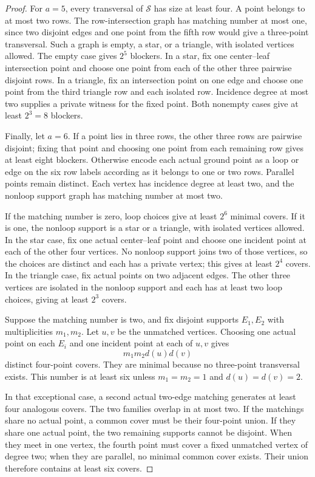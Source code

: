 \documentclass[11pt]{article}
\theoremstyle{definition}
\theoremstyle{remark}
\begin{document}
\begin{proof}
For $a=5$, every transversal of $\mathcal S$ has size at least four.  A point
belongs to at most two rows.  The row-intersection graph has matching number
at most one, since two disjoint edges and one point from the fifth row would
give a three-point transversal.  Such a graph is empty, a star, or a triangle,
with isolated vertices allowed.  The empty case gives $2^5$ blockers.  In a
star, fix one center--leaf intersection point and choose one point from each
of the other three pairwise disjoint rows.  In a triangle, fix an intersection
point on one edge and choose one point from the third triangle row and each
isolated row.  Incidence degree at most two supplies a private witness for the
fixed point.  Both nonempty cases give at least $2^3=8$ blockers.

Finally, let $a=6$.  If a point lies in three rows, the other three rows are
pairwise disjoint; fixing that point and choosing one point from each remaining
row gives at least eight blockers.  Otherwise encode each actual ground point
as a loop or edge on the six row labels according as it belongs to one or two
rows.  Parallel points remain distinct.  Each vertex has incidence degree at
least two, and the nonloop support graph has matching number at most two.

If the matching number is zero, loop choices give at least $2^6$ minimal
covers.  If it is one, the nonloop support is a star or a triangle, with
isolated vertices allowed.  In the star case, fix one actual center--leaf
point and choose one incident point at each of the other four vertices.  No
nonloop support joins two of those vertices, so the choices are distinct and
each has a private vertex; this gives at least $2^4$ covers.  In the triangle
case, fix actual points on two adjacent edges.  The other three vertices are
isolated in the nonloop support and each has at least two loop choices, giving
at least $2^3$ covers.

Suppose the matching number is two, and fix disjoint supports $E_1,E_2$ with
multiplicities $m_1,m_2$.  Let $u,v$ be the unmatched vertices.  Choosing one
actual point on each $E_i$ and one incident point at each of $u,v$ gives
\[
  m_1m_2d(u)d(v)
\]
distinct four-point covers.  They are minimal because no three-point
transversal exists.  This number is at least six unless
$m_1=m_2=1$ and $d(u)=d(v)=2$.

In that exceptional case, a second actual two-edge matching generates at
least four analogous covers.  The two families overlap in at most two.  If
the matchings share no actual point, a common cover must be their four-point
union.  If they share one actual point, the two remaining supports cannot be
disjoint.  When they meet in one vertex, the fourth point must cover a fixed
unmatched vertex of degree two; when they are parallel, no minimal common
cover exists.  Their union therefore contains at least six covers.


\end{proof}
\end{document}
